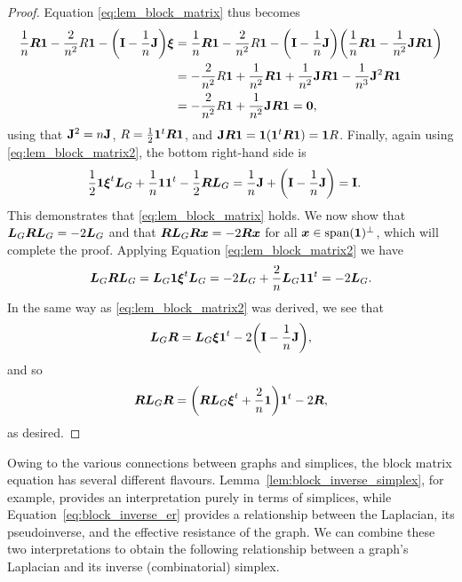 \begin{proof}
Equation \eqref{eq:lem_block_matrix} thus becomes 
\begin{align*}
\frac{1}{n}\vb*{R}\vb{1} -\frac{2}{n^2}R \vb{1} - \bigg(\vb{I}-\frac{1}{n}\vb{J}\bigg)\vb*{\xi} &= \frac{1}{n}\vb*{R}\vb{1} - \frac{2}{n^2}R\vb{1} - \bigg(\vb{I}-\frac{1}{n}\vb{J}\bigg)\bigg(\frac{1}{n}\vb*{R}\vb{1} - \frac{1}{n^2}\vb{J}\vb*{R}\vb{1}\bigg) \\
&= -\frac{2}{n^2} R\vb{1} + \frac{1}{n^2}\vb*{R}\vb{1} + \frac{1}{n^2}\vb{J}\vb*{R}\vb{1} - \frac{1}{n^3}\vb{J}^2\vb*{R}\vb{1} \\
&= -\frac{2}{n^2} R\vb{1} +\frac{1}{n^2} \vb{J}\vb*{R}\vb{1} = \vb{0},
\end{align*}
using that $\vb{J}^2 = n \vb{J}$, $R=\frac{1}{2}\vb{1}^t \vb*{R}\vb{1}$, and $\vb{J}\vb*{R}\vb{1} = \vb{1}(\vb{1}^t \vb*{R}\vb{1}) = \vb{1} R$. Finally, again using \eqref{eq:lem_block_matrix2}, the bottom right-hand side is 
\begin{align*}
\frac{1}{2}\vb{1} \vb*{\xi}^t \vb*{L}_G + \frac{1}{n}\vb{1}\vb{1}^t - \frac{1}{2}\vb*{R}\vb*{L}_G &= \frac{1}{n}\vb{J} + \bigg(\vb{I}-\frac{1}{n}\vb{J}\bigg) = \vb{I}.
\end{align*}
This demonstrates that \eqref{eq:lem_block_matrix} holds. We now show that $\vb*{L}_G \vb*{R}\vb*{L}_G = -2 \vb*{L}_G$ and that $\vb*{R}\vb*{L}_G\vb*{R}\vb*{x} = -2\vb*{R}\vb*{x}$ for all $\vb*{x}\in\textnormal{span}(\vb{1})^\perp$, which will complete the proof. Applying Equation \eqref{eq:lem_block_matrix2} we have 
\begin{align*}
\vb*{L}_G\vb*{R}\vb*{L}_G = \vb*{L}_G\vb{1} \vb*{\xi}^t\vb*{L}_G = -2\vb*{L}_G+ \frac{2}{n}\vb*{L}_G\vb{1}\vb{1}^t = -2\vb*{L}_G.
\end{align*}
In the same way as \eqref{eq:lem_block_matrix2} was derived, we see that 
\begin{equation*}
\vb*{L}_G\vb*{R} = \vb*{L}_G\vb*{\xi}\vb{1}^t - 2\bigg(\vb{I}-\frac{1}{n}\vb{J}\bigg),
\end{equation*}
and so 
\begin{equation*}
\vb*{R}\vb*{L}_G\vb*{R}= \bigg(\vb*{R}\vb*{L}_G\vb*{\xi}^t + \frac{2}{n}\vb{1} \bigg)\vb{1}^t -2\vb*{R},
\end{equation*}
as desired. 
\end{proof}

Owing to the various connections between graphs and simplices, the block matrix equation has several different flavours. Lemma~\ref{lem:block_inverse_simplex}, for example, provides an interpretation purely in terms of simplices, while Equation~\eqref{eq:block_inverse_er} provides a relationship between the Laplacian, its pseudoinverse, and  the effective resistance of the graph. 
We can combine  these two interpretations to obtain the following relationship between a graph's Laplacian and its inverse (combinatorial) simplex. 

